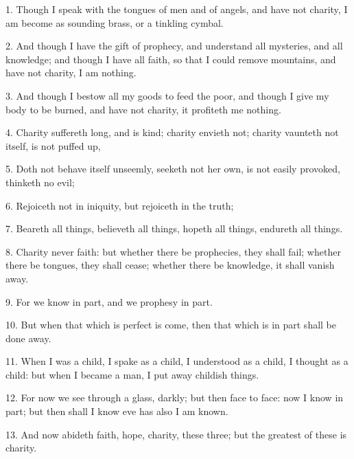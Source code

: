 \setcounter{footnote}{0}

1. Though I speak with the tongues of men and of angels, and have not charity, I
am become as sounding brass, or a tinkling cymbal.

2. And though I have the gift of prophecy, and understand all mysteries, and all
knowledge; and though I have all faith, so that I could remove mountains, and have
not charity, I am nothing.

3. And though I bestow all my goods to feed the poor, and though I give my body
to be burned, and have not charity, it profiteth me nothing.

4. Charity suffereth long, and is kind; charity envieth not; charity vaunteth not
itself, is not puffed up,

5. Doth not behave itself unseemly, seeketh not her own, is not easily provoked,
thinketh no evil;

6. Rejoiceth not in iniquity, but rejoiceth in the truth;

7. Beareth all things, believeth all things, hopeth all things, endureth all things.

8. Charity never faith: but whether there be prophecies, they shall fail; whether
there be tongues, they shall cease; whether there be knowledge, it shall vanish
away.

9. For we know in part, and we prophesy in part.

10. But when that which is perfect is come, then that which is in part shall be
done away.

11. When I was a child, I spake as a child, I understood as a child, I thought as
a child: but when I became a man, I put away childish things.

12. For now we see through a glass, darkly; but then face to face: now I know in
part; but then shall I know eve has also I am known.

13. And now abideth faith, hope, charity, these three; but the greatest of these
is charity.

